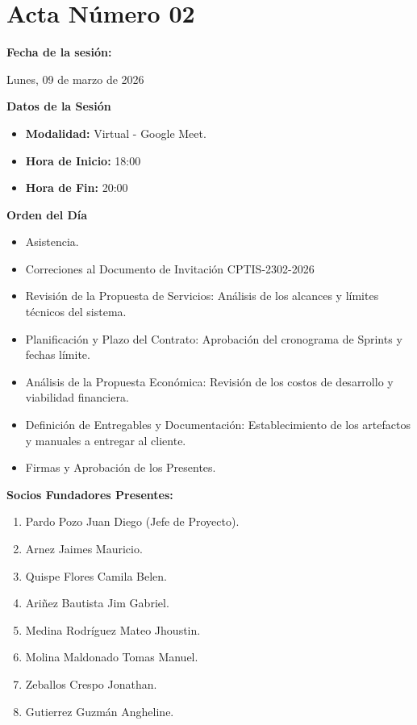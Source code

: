\newpage
\section{Acta Número 02}
\label{sec:acta02}

\noindent \textbf{Fecha de la sesión:}\par
Lunes, 09 de marzo de 2026

\vspace*{0.5cm}
\noindent \textbf{Datos de la Sesión}
\vspace{-0.2cm}
\begin{itemize}[noitemsep]
    \item \textbf{Modalidad:} Virtual - Google Meet.
    \item \textbf{Hora de Inicio:} 18:00
    \item \textbf{Hora de Fin:} 20:00
\end{itemize}

\vspace*{0.5cm}
\noindent \textbf{Orden del Día}
\vspace{-0.2cm}
\begin{itemize}[noitemsep]
    \item Asistencia.
    \item Correciones al Documento de Invitación CPTIS-2302-2026
    \item Revisión de la Propuesta de Servicios: Análisis de los alcances y límites técnicos del sistema.
    \item Planificación y Plazo del Contrato: Aprobación del cronograma de Sprints y fechas límite.
    \item Análisis de la Propuesta Económica: Revisión de los costos de desarrollo y viabilidad financiera.
    \item Definición de Entregables y Documentación: Establecimiento de los artefactos y manuales a entregar al cliente.
    \item Firmas y Aprobación de los Presentes.
\end{itemize}

\vspace*{0.5cm}
\noindent \textbf{Socios Fundadores Presentes:}
\vspace{-0.2cm}
\begin{enumerate}[noitemsep]
    \item Pardo Pozo Juan Diego (Jefe de Proyecto).
    \item Arnez Jaimes Mauricio.
    \item Quispe Flores Camila Belen.
    \item Ariñez Bautista Jim Gabriel.
    \item Medina Rodríguez Mateo Jhoustin.
    \item Molina Maldonado Tomas Manuel.
    \item Zeballos Crespo Jonathan.
    \item Gutierrez Guzmán Angheline.
\end{enumerate}

